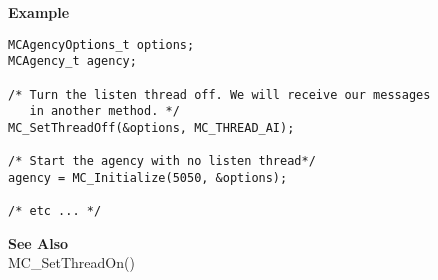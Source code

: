 \noindent
{\bf Example}\\
\begin{verbatim}
MCAgencyOptions_t options;
MCAgency_t agency;

/* Turn the listen thread off. We will receive our messages 
   in another method. */
MC_SetThreadOff(&options, MC_THREAD_AI);

/* Start the agency with no listen thread*/
agency = MC_Initialize(5050, &options);

/* etc ... */
\end{verbatim}

\noindent
{\bf See Also}\\
MC\_SetThreadOn()\\

